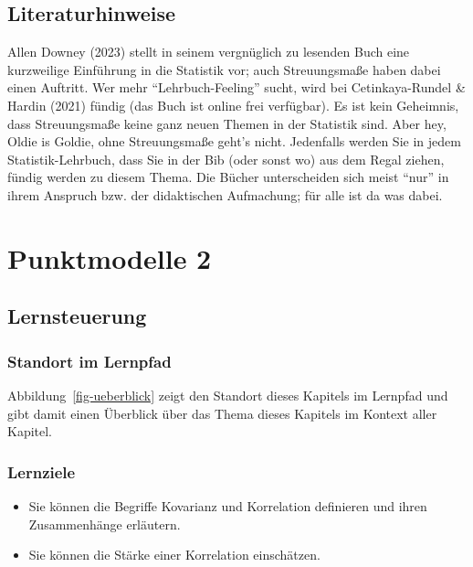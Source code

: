 \documentclass[
  letterpaper,
]{scrbook}
\providecommand{\tightlist}{%
  \setlength{\itemsep}{0pt}\setlength{\parskip}{0pt}}\usepackage{longtable,booktabs,array}
\theoremstyle{definition}
\theoremstyle{definition}
\theoremstyle{definition}
\theoremstyle{remark}
\begin{document}
\section{Literaturhinweise}\label{literaturhinweise-5}

Allen Downey (2023) stellt in seinem vergnüglich zu lesenden Buch eine
kurzweilige Einführung in die Statistik vor; auch Streuungsmaße haben
dabei einen Auftritt. Wer mehr \enquote{Lehrbuch-Feeling} sucht, wird
bei Cetinkaya-Rundel \& Hardin (2021) fündig (das Buch ist online frei
verfügbar). Es ist kein Geheimnis, dass Streuungsmaße keine ganz neuen
Themen in der Statistik sind. Aber hey, Oldie is Goldie, ohne
Streuungsmaße geht's nicht. Jedenfalls werden Sie in jedem
Statistik-Lehrbuch, dass Sie in der Bib (oder sonst wo) aus dem Regal
ziehen, fündig werden zu diesem Thema. Die Bücher unterscheiden sich
meist \enquote{nur} in ihrem Anspruch bzw. der didaktischen Aufmachung;
für alle ist da was dabei.

\chapter{Punktmodelle 2}\label{sec-zusammenhaenge}

\section{Lernsteuerung}\label{lernsteuerung-6}

\subsection{Standort im Lernpfad}\label{standort-im-lernpfad}

Abbildung~\ref{fig-ueberblick} zeigt den Standort dieses Kapitels im
Lernpfad und gibt damit einen Überblick über das Thema dieses Kapitels
im Kontext aller Kapitel.

\subsection{Lernziele}\label{lernziele-7}

\begin{itemize}
\tightlist
\item
  Sie können die Begriffe Kovarianz und Korrelation definieren und ihren
  Zusammenhänge erläutern.
\item
  Sie können die Stärke einer Korrelation einschätzen.
\end{itemize}
\end{document}
